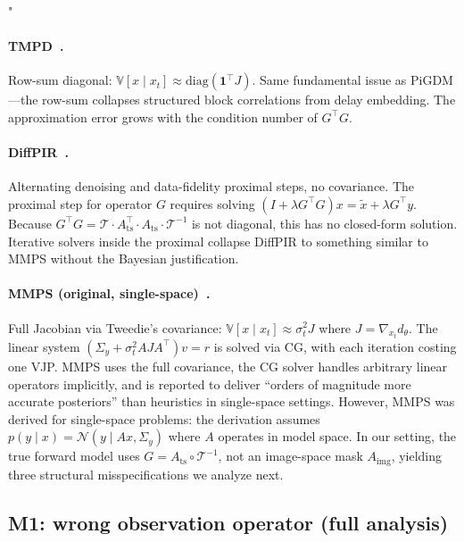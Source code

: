 "\documentclass{article}
\theoremstyle{plain}
\theoremstyle{definition}
\theoremstyle{remark}
\newcommand{\tsimg}{\mathcal{T}}
\newcommand{\imgts}{\mathcal{T}^{-1}}
\newcommand{\Ats}{A_{\mathrm{ts}}}
\newcommand{\Aimg}{A_{\mathrm{img}}}
\begin{document}
\paragraph{TMPD~\citep{boys2023tmpd}.}
Row-sum diagonal: $\mathbb{V}[x \mid x_t] \approx \mathrm{diag}(\mathbf{1}^\top J)$. Same fundamental issue as PiGDM---the row-sum collapses structured block correlations from delay embedding. The approximation error grows with the condition number of $G^\top G$.

\paragraph{DiffPIR~\citep{zhu2023diffpir}.}
Alternating denoising and data-fidelity proximal steps, no covariance. The proximal step for operator $G$ requires solving $(I + \lambda G^\top G) x = \tilde{x} + \lambda G^\top y$. Because $G^\top G = \tsimg \cdot \Ats^\top \cdot \Ats \cdot \imgts$ is not diagonal, this has no closed-form solution. Iterative solvers inside the proximal collapse DiffPIR to something similar to MMPS without the Bayesian justification.

\paragraph{MMPS (original, single-space)~\citep{rozet2024diem}.}
Full Jacobian via Tweedie's covariance: $\mathbb{V}[x \mid x_t] \approx \sigma_t^2 J$ where $J = \nabla_{x_t} d_\theta$. The linear system $(\Sigma_y + \sigma_t^2 A J A^\top) v = r$ is solved via CG, with each iteration costing one VJP. MMPS uses the full covariance, the CG solver handles arbitrary linear operators implicitly, and is reported to deliver ``orders of magnitude more accurate posteriors'' than heuristics in single-space settings. However, MMPS was derived for single-space problems: the derivation assumes $p(y \mid x) = \mathcal{N}(y \mid Ax, \Sigma_y)$ where $A$ operates in model space. In our setting, the true forward model uses $G = \Ats \circ \imgts$, not an image-space mask $\Aimg$, yielding three structural misspecifications we analyze next.

\subsection{M1: wrong observation operator (full analysis)}
\label{app:M1}
\end{document}
